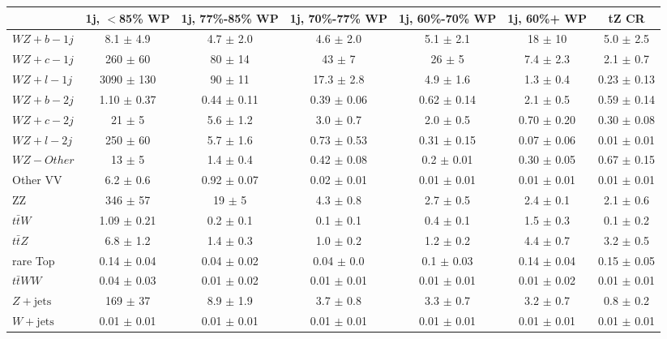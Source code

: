 \begin{tabular}{|l|c|c|c|c|c|c|}
\hline 
 & {1j, $<$85\% WP} & {1j, 77\%-85\% WP} & {1j, 70\%-77\% WP} & {1j, 60\%-70\% WP} & {1j, 60\%+ WP} & {tZ CR}\\
\hline 
  $WZ + b - 1j$   & 8.1 $\pm$ 4.9 & 4.7 $\pm$ 2.0 & 4.6 $\pm$ 2.0 & 5.1 $\pm$ 2.1 & 18 $\pm$ 10 & 5.0 $\pm$ 2.5 \\ 
  $WZ + c - 1j$   & 260 $\pm$ 60 & 80 $\pm$ 14 & 43 $\pm$ 7 & 26 $\pm$ 5 & 7.4 $\pm$ 2.3 & 2.1 $\pm$ 0.7 \\ 
  $WZ + l - 1j$   & 3090 $\pm$ 130 & 90 $\pm$ 11 & 17.3 $\pm$ 2.8 & 4.9 $\pm$ 1.6 & 1.3 $\pm$ 0.4 & 0.23 $\pm$ 0.13 \\ 
  $WZ + b - 2j$   & 1.10 $\pm$ 0.37 & 0.44 $\pm$ 0.11 & 0.39 $\pm$ 0.06 & 0.62 $\pm$ 0.14 & 2.1 $\pm$ 0.5 & 0.59 $\pm$ 0.14 \\
  $WZ + c - 2j$   & 21 $\pm$ 5 & 5.6 $\pm$ 1.2 & 3.0 $\pm$ 0.7 & 2.0 $\pm$ 0.5 & 0.70 $\pm$ 0.20 & 0.30 $\pm$ 0.08\\
  $WZ + l - 2j$   & 250 $\pm$ 60 & 5.7 $\pm$ 1.6 & 0.73 $\pm$ 0.53 & 0.31 $\pm$ 0.15 & 0.07 $\pm$ 0.06 & 0.01 $\pm$ 0.01 \\
  $WZ - Other$   & 13 $\pm$ 5 & 1.4 $\pm$ 0.4 & 0.42 $\pm$ 0.08 & 0.2 $\pm$ 0.01 & 0.30 $\pm$ 0.05 & 0.67 $\pm$ 0.15 \\
  Other VV   & 6.2 $\pm$ 0.6 & 0.92 $\pm$ 0.07 & 0.02 $\pm$ 0.01 & 0.01 $\pm$ 0.01 & 0.01 $\pm$ 0.01 & 0.01 $\pm$ 0.01 \\
  ZZ  & 346 $\pm$ 57 & 19 $\pm$ 5 & 4.3 $\pm$ 0.8 & 2.7 $\pm$ 0.5 & 2.4 $\pm$ 0.1 & 2.1 $\pm$ 0.6 \\ 
  $t\bar{t}W$   & 1.09 $\pm$ 0.21 & 0.2 $\pm$ 0.1 & 0.1 $\pm$ 0.1 & 0.4 $\pm$ 0.1 & 1.5 $\pm$ 0.3 & 0.1 $\pm$ 0.2 \\ 
  $t\bar{t}Z$   & 6.8 $\pm$ 1.2 & 1.4 $\pm$ 0.3 & 1.0 $\pm$ 0.2 & 1.2 $\pm$ 0.2 & 4.4 $\pm$ 0.7 & 3.2 $\pm$ 0.5 \\ 
  rare Top   & 0.14 $\pm$ 0.04 & 0.04 $\pm$ 0.02 & 0.04 $\pm$ 0.0 & 0.1 $\pm$ 0.03 & 0.14 $\pm$ 0.04 & 0.15 $\pm$ 0.05 \\ 
  $t\bar{t}WW$   & 0.04 $\pm$ 0.03 & 0.01 $\pm$ 0.02 & 0.01 $\pm$ 0.01 & 0.01 $\pm$ 0.01 & 0.01 $\pm$ 0.02 & 0.01 $\pm$ 0.01 \\ 
  $Z+\text{jets}$   & 169 $\pm$ 37 & 8.9 $\pm$ 1.9 & 3.7 $\pm$ 0.8 & 3.3 $\pm$ 0.7 & 3.2 $\pm$ 0.7 & 0.8 $\pm$ 0.2 \\ 
  $W+\text{jets}$   & 0.01 $\pm$ 0.01 & 0.01 $\pm$ 0.01 & 0.01 $\pm$ 0.01 & 0.01 $\pm$ 0.01 & 0.01 $\pm$ 0.01 & 0.01 $\pm$ 0.01 \\ 

\end{tabular}
